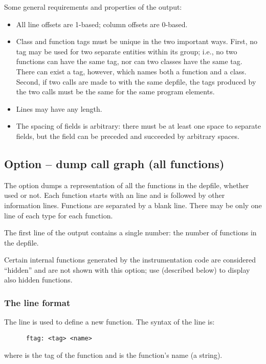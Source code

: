 Some general requirements and properties of the output:
\begin{itemize}
\item
All line offsets are 1-based; column offsets are 0-based.
\item
Class and function tags must be unique in the two important ways. First,
no tag may be used for two separate entities within its group; i.e., no
two functions can have the same tag, nor can two classes have the same
tag. There can exist a tag, however, which names both a function and a
class. Second, if two calls are made to  with the same
depfile, the tags produced by the two calls must be the same for the
same program elements.
\item
Lines may have any length.
\item
The spacing of fields is arbitrary: there must be at least one space to
separate fields, but the field can be preceded and succeeded by
arbitrary spaces.
\end{itemize}

\subsection{Option  -- dump call graph (all functions)}

The  option dumps a representation of all the functions 
in the depfile, whether used or not. Each function starts with an 
line and is followed by other information lines. Functions are separated
by a blank line. There may be only one line of each type for each function.

The first line of the output contains a single number: the number of functions
in the depfile.

Certain internal functions generated by the instrumentation code are
considered ``hidden'' and are not shown with this option; use
 (described below) to display also hidden functions.

\subsubsection{The  line format}

The  line is used to define a new function. The syntax of the
 line is:
\begin{verbatim}
      ftag: <tag> <name>
\end{verbatim}
\noindent
where  is the tag of the function and  is the 
function's name (a string). 

